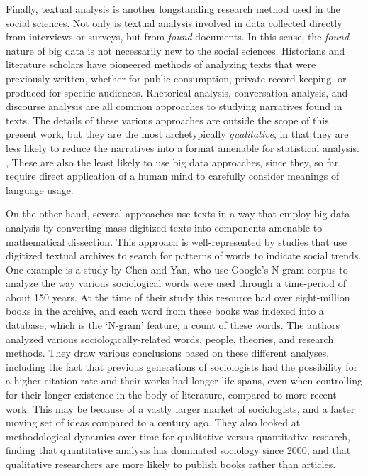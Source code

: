 \documentclass[sigconf]{acmart}
\begin{document}
Finally, textual analysis is another longstanding research method used in the social sciences.  Not only is textual analysis involved in data collected directly from interviews or surveys, but from {\em found} documents.  In this sense, the {\em found} nature of big data is not necessarily new to the social sciences.  Historians and literature scholars have pioneered methods of analyzing texts that were previously written, whether for public consumption, private record-keeping, or produced for specific audiences.  Rhetorical analysis, conversation analysis, and discourse analysis are all common approaches to studying narratives found in texts. The details of these various approaches are outside the scope of this present work, but they are the most archetypically {\em qualitative}, in that they are less likely to reduce the narratives into a format amenable for statistical analysis. \cite{bryman16}, \cite{sagi14}  These are also the least likely to use big data approaches, since they, so far, require direct application of a human mind to carefully consider meanings of language usage.

On the other hand, several approaches use texts in a way that employ big data analysis by converting mass digitized texts into components amenable to mathematical dissection.  This approach is well-represented by studies that use digitized textual archives to search for patterns of words to indicate social trends.  One example is a study by Chen and Yan, who use Google's N-gram corpus to analyze the way various sociological words were used through a time-period of about 150 years. \cite{chen16}  At the time of their study this resource had over eight-million books in the archive, and each word from these books was indexed into a database, which is the `N-gram' feature, a count of these words.  The authors analyzed various sociologically-related words, people, theories, and research methods. They draw various conclusions based on these different analyses, including the fact that previous generations of sociologists had the possibility for a higher citation rate and their works had longer life-spans, even when controlling for their longer existence in the body of literature, compared to more recent work.  This may be because of a vastly larger market of sociologists, and a faster moving set of ideas compared to a century ago.  They also looked at methodological dynamics over time for qualitative versus quantitative research, finding that quantitative analysis has dominated sociology since 2000, and that qualitative researchers are more likely to publish books rather than articles. \cite{chen16}
\end{document}
